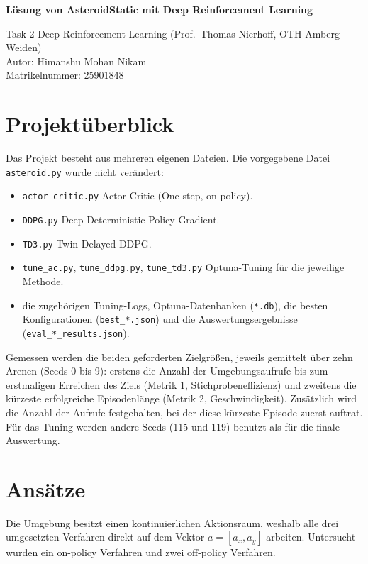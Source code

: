 \documentclass[11pt,a4paper]{article}
\begin{document}
\begin{center}
{\LARGE\bfseries Lösung von AsteroidStatic mit Deep Reinforcement Learning}
\end{center}
\vspace{0.2cm}
{\color{gray}
Task 2 \textendash{} Deep Reinforcement Learning (Prof.\ Thomas Nierhoff, OTH Amberg-Weiden)\\
Autor: Himanshu Mohan Nikam\\
Matrikelnummer: 25901848
}
\vspace{0.4cm}

\section{Projektüberblick}
Das Projekt besteht aus mehreren eigenen Dateien. Die vorgegebene Datei \texttt{asteroid.py}
wurde nicht verändert:
\begin{itemize}\setlength\itemsep{1pt}
  \item \texttt{actor\_critic.py} \textendash{} Actor-Critic (One-step, on-policy).
  \item \texttt{DDPG.py} \textendash{} Deep Deterministic Policy Gradient.
  \item \texttt{TD3.py} \textendash{} Twin Delayed DDPG.
  \item \texttt{tune\_ac.py}, \texttt{tune\_ddpg.py}, \texttt{tune\_td3.py} \textendash{}
        Optuna-Tuning für die jeweilige Methode.
  \item die zugehörigen Tuning-Logs, Optuna-Datenbanken
        (\texttt{*.db}), die besten Konfigurationen (\texttt{best\_*.json}) und die
        Auswertungsergebnisse (\texttt{eval\_*\_results.json}).
\end{itemize}

Gemessen werden die beiden geforderten Zielgrößen, jeweils gemittelt über zehn Arenen
(Seeds 0 bis 9): erstens die Anzahl der Umgebungsaufrufe bis zum erstmaligen Erreichen des
Ziels (Metrik 1, Stichprobeneffizienz) und zweitens die kürzeste erfolgreiche Episodenlänge
(Metrik 2, Geschwindigkeit). Zusätzlich wird die Anzahl der Aufrufe festgehalten, bei der
diese kürzeste Episode zuerst auftrat. Für das Tuning werden andere Seeds (115 und 119)
benutzt als für die finale Auswertung.

\section{Ansätze}
Die Umgebung besitzt einen kontinuierlichen Aktionsraum, weshalb alle drei umgesetzten
Verfahren direkt auf dem Vektor $a=[a_x,a_y]$ arbeiten. Untersucht wurden ein on-policy
Verfahren und zwei off-policy Verfahren.
\end{document}

